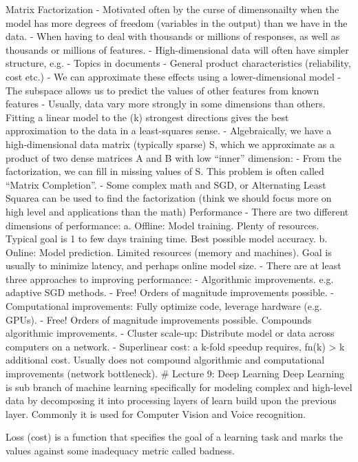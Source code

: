 \documentclass[3pt,landscape]{article}
\begin{document}
\begin{multicols}{3}
Matrix Factorization
- Motivated often by the curse of dimensonailty when the model has more degrees of freedom (variables in the output) than we have in the data.
- When having to deal with thousands or millions of responses, as well as thousands or millions of features. 
- High-dimensional data will often have simpler structure, e.g.
  - Topics in documents
  - General product characteristics (reliability, cost etc.)
- We can approximate these effects using a lower-dimensional model
- The subspace allows us to predict the values of other features from known features 
- Usually, data vary more strongly in some dimensions than others. Fitting a linear model to the (k) strongest directions gives the best approximation to the data in a least-squares sense.
- Algebraically, we have a high-dimensional data matrix (typically sparse) S, which we approximate as a product of two dense matrices A and B with low “inner” dimension: 
  - From the factorization, we can fill in missing values of S. This problem is often called “Matrix Completion”. 
- Some complex math and SGD, or Alternating Least Squarea can be used to find the factorization (think we should focus more on high level and applications than the math)
Performance
- There are two different dimensions of performance:
  a. Offline: Model training. Plenty of resources. Typical goal is 1 to few days training time. Best possible model accuracy.
  b. Online: Model prediction. Limited resources (memory and machines). Goal is usually to minimize latency, and perhaps online model size. 
- There are at least three approaches to improving performance:
  - Algorithmic improvements. e.g. adaptive SGD methods.
    - Free! Orders of magnitude improvements possible.
  - Computational improvements: Fully optimize code, leverage hardware (e.g. GPUs).
    - Free! Orders of magnitude improvements possible. Compounds algorithmic improvements.
  - Cluster scale-up: Distribute model or data across computers on a network.
    - Superlinear cost: a k-fold speedup requires, fn(k) > k additional cost. Usually does not compound algorithmic and computational improvements (network bottleneck). 
\# Lecture 9: Deep Learning
Deep Learning is sub branch of machine learning specifically for modeling complex and high-level data by decomposing it into processing layers of learn build upon the previous layer. Commonly it is used for Computer Vision and Voice recognition. 

Loss (cost) is a function that specifies the goal of a learning task and marks the values against some inadequacy metric called badness.


\end{multicols}
\end{document}
